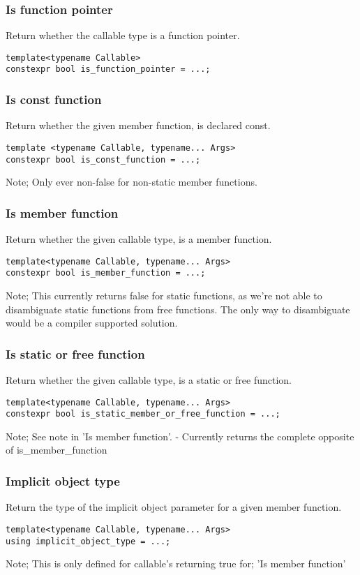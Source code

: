 \subsubsection{Is function pointer}
Return whether the callable type is a function pointer.
\begin{verbatim}
template<typename Callable>
constexpr bool is_function_pointer = ...;
\end{verbatim}

\subsubsection{Is const function}
Return whether the given member function, is declared const.
\begin{verbatim}
template <typename Callable, typename... Args>
constexpr bool is_const_function = ...;
\end{verbatim}
Note; Only ever non-false for non-static member functions.

\subsubsection{Is member function}
Return whether the given callable type, is a member function.
\begin{verbatim}
template<typename Callable, typename... Args>
constexpr bool is_member_function = ...;
\end{verbatim}
Note; This currently returns false for static functions, as we're not able to
disambiguate static functions from free functions.
The only way to disambiguate would be a compiler supported solution.

\subsubsection{Is static or free function}
Return whether the given callable type, is a static or free function.
\begin{verbatim}
template<typename Callable, typename... Args>
constexpr bool is_static_member_or_free_function = ...;
\end{verbatim}
Note; See note in 'Is member function'. - Currently returns the complete
opposite of is\_member\_function

\subsubsection{Implicit object type}
Return the type of the implicit object parameter for a given member function.
\begin{verbatim}
template<typename Callable, typename... Args>
using implicit_object_type = ...;
\end{verbatim}
Note; This is only defined for callable's returning true for;
'Is member function'

